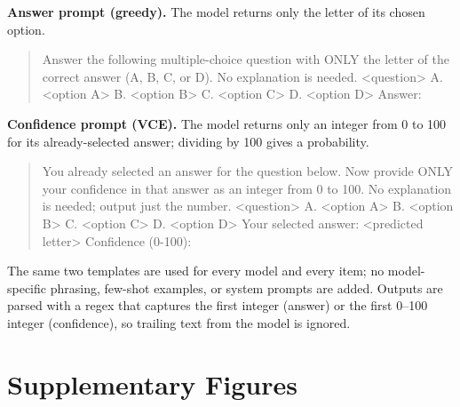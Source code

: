 \documentclass[11pt]{article}
\begin{document}
\textbf{Answer prompt (greedy).} The model returns only the letter of its chosen option.

\begin{quote}
\small\ttfamily
Answer the following multiple-choice question with ONLY the letter of the correct answer (A, B, C, or D). No explanation is needed.\newline
\newline
<question>\newline
A. <option A>\newline
B. <option B>\newline
C. <option C>\newline
D. <option D>\newline
\newline
Answer:
\end{quote}

\textbf{Confidence prompt (VCE).} The model returns only an integer from 0 to 100 for its already-selected answer; dividing by 100 gives a probability.

\begin{quote}
\small\ttfamily
You already selected an answer for the question below.\newline
Now provide ONLY your confidence in that answer as an integer from 0 to 100.\newline
No explanation is needed; output just the number.\newline
\newline
<question>\newline
A. <option A>\newline
B. <option B>\newline
C. <option C>\newline
D. <option D>\newline
\newline
Your selected answer: <predicted letter>\newline
\newline
Confidence (0-100):
\end{quote}

The same two templates are used for every model and every item; no model-specific phrasing, few-shot examples, or system prompts are added. Outputs are parsed with a regex that captures the first integer (answer) or the first 0--100 integer (confidence), so trailing text from the model is ignored.

\section{Supplementary Figures}
\label{app:figures}
\end{document}
